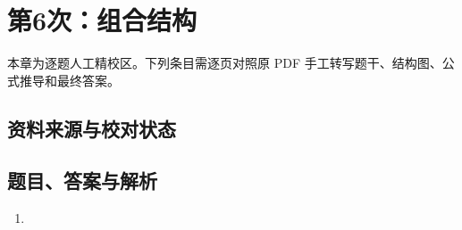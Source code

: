 \chapter{第6次：组合结构}

本章为逐题人工精校区。下列条目需逐页对照原 PDF 手工转写题干、结构图、公式推导和最终答案。

\section{资料来源与校对状态}


\section{题目、答案与解析}

\begin{enumerate}[label=\textbf{第\arabic*题},wide]
  \item
  \begin{problemBox}
  \end{problemBox}

  \begin{solutionBox}
  \end{solutionBox}
\end{enumerate}
